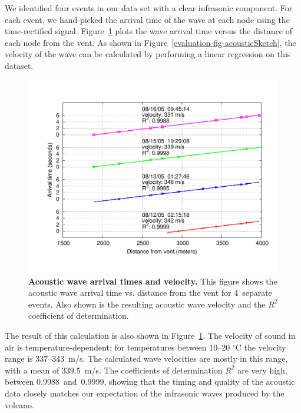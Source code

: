 We identified four events in our data set with a clear infrasonic component.
For each event, we hand-picked the arrival time of the wave at each node
using the time-rectified signal. Figure~\ref{evaluation-fig-acousticArrival}
plots the wave arrival time versus the distance of each node from the vent.
As shown in Figure~\ref{evaluation-fig-acousticSketch}, the velocity of the
wave can be calculated by performing a linear regression on this dataset.

\begin{figure}[t]
\begin{center}
\includegraphics[width=\hsize]{./5-evaluation/figs/fidelity/acousticArrival/acoustic.pdf}
\end{center}
\caption{\textbf{Acoustic wave arrival times and velocity.}
This figure shows the acoustic wave arrival time vs. distance from the vent
for 4~separate events. Also shown is the resulting acoustic wave velocity and
the $R^2$ coefficient of determination.}
\label{evaluation-fig-acousticArrival}
\end{figure}

The result of this calculation is also shown in
Figure~\ref{evaluation-fig-acousticArrival}. The velocity of sound in air is
temperature-dependent; for temperatures between 10--20 $^{\circ}$C the
velocity range is 337--343~m/s. The calculated wave velocities are mostly in
this range, with a mean of 339.5~m/s. The coefficients of determination $R^2$
are very high, between 0.9988~and~0.9999, showing that the timing and quality
of the acoustic data closely matches our expectation of the infrasonic waves
produced by the volcano.

